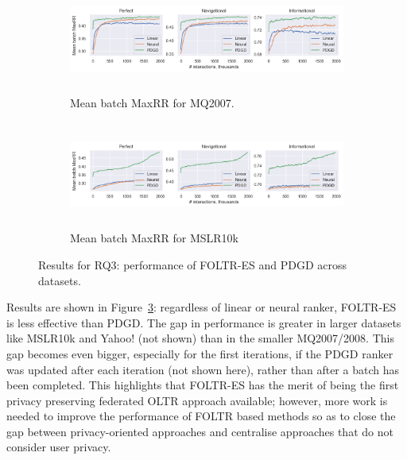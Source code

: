 \begin{figure}[t]
	\centering
	\begin{subfigure}{1\textwidth}
		\includegraphics[width=15cm, height=3.5cm]{images/RQ3n4/mq2007_foltr_PDGD_mrr_c2000_p1.0}
		\caption{Mean batch MaxRR for MQ2007.}
		\label{fig:mq2007-rq3}
	\end{subfigure}
	\begin{subfigure}{1\textwidth}
		\includegraphics[width=15cm, height=3.5cm]{images/RQ3n4/mslr10k_foltr_PDGD_mrr_c2000_p1.0.png}
		\caption{Mean batch MaxRR for MSLR10k}
		\label{fig:mslr10k-rq3}
	\end{subfigure}
	\caption{Results for RQ3: performance of FOLTR-ES and PDGD across datasets. \label{fig:RQ3}} 
\end{figure}

Results are shown in Figure~\ref{fig:RQ3}: regardless of linear or neural ranker, FOLTR-ES is less effective than PDGD. The gap in performance is greater in larger datasets like MSLR10k and Yahoo! (not shown) than in the smaller MQ2007/2008. This gap becomes even bigger, especially for the first iterations, if the PDGD ranker was updated after each iteration (not shown here), rather than after a batch has been completed. This highlights that FOLTR-ES has the merit of being the first privacy preserving federated OLTR approach available; however, more work is needed to improve the performance of FOLTR based methods so as to close the gap between privacy-oriented approaches and centralise approaches that do not consider user privacy.


